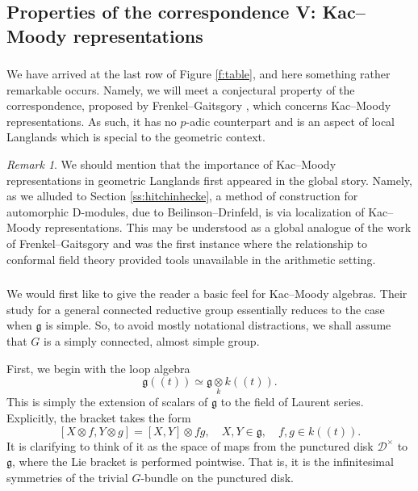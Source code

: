 \documentclass[10pt]{amsart}
\newcommand{\fg}{\mathfrak{g}}
\theoremstyle{remark}
\newtheorem{re}[subsubsection]{Remark}
\newcommand{\sD}{\mathscr{D}}
\numberwithin{equation}{section}
\begin{document}
	
	
	
	
	\subsection{Properties of the correspondence V: Kac--Moody representations}
	
	
	
	\subsubsection{} We have arrived at the last row of Figure \ref{f:table}, 
	and here something rather remarkable occurs. Namely, we will meet a 
	conjectural property of the correspondence, proposed by Frenkel--Gaitsgory \cite{frenkgaitslocallangds}, 
	which concerns Kac--Moody representations. As such, it has no $p$-adic 
	counterpart and is an aspect of local Langlands which is special to 
	the geometric context. 
	
	\begin{re} We should mention that the importance of Kac--Moody 
	representations in geometric Langlands first appeared in the global 
	story. Namely, as we alluded to Section \ref{ss:hitchinhecke}, a method of construction 
	for automorphic D-modules, due to Beilinson--Drinfeld, is via localization of 
	Kac--Moody representations. This may be understood as a global analogue of the work of Frenkel--Gaitsgory and was the first instance where the relationship to 
	conformal field theory provided tools unavailable in the arithmetic 
	setting. \end{re}
	
	\subsubsection{}  We would first like to give the reader a basic feel for 
	Kac--Moody algebras. Their study for a general connected reductive group 
	essentially reduces to the case when $\fg$ is simple. So, to avoid mostly 
	notational distractions, we shall assume that $G$ is a simply connected, almost simple 
	group. 
	
	
	First, we begin with the loop algebra 
	\[
	   \fg(\!(t)\!) \simeq \fg \underset  k \otimes k(\!(t)\!).
	\]
	This is simply the extension of scalars of $\fg$ to the field of Laurent 
	series. Explicitly, the bracket takes the form 
	\[
	   [ X \otimes f, Y \otimes g] = [X,Y] \otimes fg, \quad X,Y \in \fg, \quad 
	   f, g \in k(\!(t)\!). 
	\]
	It is clarifying to think of it as the space of maps from 
	the punctured disk $\sD^\times$ to $\fg$, where the Lie bracket is 
	performed pointwise. That is, it is the infinitesimal symmetries 
	of the trivial $G$-bundle on the punctured disk. 
	
\end{document}

